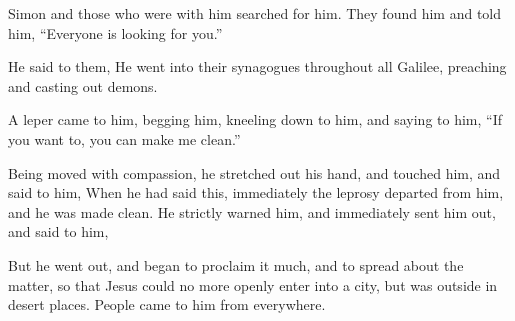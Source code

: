 {Simon and those who were with him searched for him.
They found him and told him, “Everyone is looking for you.”
\par }{\PP {}He said to them,
{}
He went into their synagogues throughout all Galilee, preaching and casting out demons.
\par }{\PP {}A leper came to him, begging him, kneeling down to him, and saying to him, “If you want to, you can make me clean.”
\par }{\PP {}Being moved with compassion, he stretched out his hand, and touched him, and said to him,
{}
When he had said this, immediately the leprosy departed from him, and he was made clean.
He strictly warned him, and immediately sent him out,
and said to him,
{}
\par }{\PP {}But he went out, and began to proclaim it much, and to spread about the matter, so that Jesus could no more openly enter into a city, but was outside in desert places. People came to him from everywhere.

}
